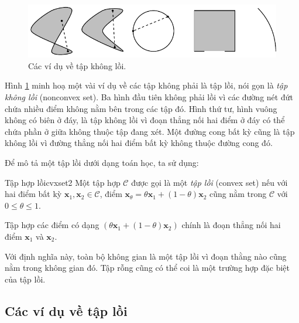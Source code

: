 
\begin{figure}[t]
\centering
\includegraphics[width = .8\textwidth]{Chapters/08_ConvexOptimization/16_convexity/latex/nonconvexsets.pdf}
\caption[]{Các ví dụ về tập không lồi.}
\label{fig:16_nonconvexsets}
\end{figure}

Hình \ref{fig:16_nonconvexsets} minh hoạ một vài ví dụ về các tập không phải là
tập lồi, nói gọn là \textit{tập không lồi} ({nonconvex set}). Ba hình đầu
tiên không phải lồi vì các đường nét đứt chứa nhiều điểm không nằm bên trong các
tập đó. Hình thứ tư, hình vuông không có biên ở đáy, là tập không lồi vì đoạn thẳng nối hai điểm ở đáy có thể chứa phần ở giữa không
thuộc tập đang xét. Một đường cong
bất kỳ cũng là tập không lồi vì đường thẳng nối hai điểm
bất kỳ không thuộc đường cong đó.

Để mô tả một {tập lồi} dưới dạng toán học, ta sử dụng:

\begin{mydef}{Tập hợp lồi}{cvxset2}
Một tập hợp $\mathcal{C}$ được gọi là một {\textit{tập lồi}} (convex set) nếu với hai điểm bất
kỳ $\mathbf{x}_1, \mathbf{x}_2 \in \mathcal{C}$, điểm $ \mathbf{x}_{\theta} =
\theta \mathbf{x}_1 + (1 - \theta) \mathbf{x}_2$ cũng nằm trong $\mathcal{C}$
với $0 \leq \theta \leq 1$.
\end{mydef}

Tập hợp các điểm có dạng $\left(\theta \mathbf{x}_1 + (1 -
\theta) \mathbf{x}_2\right)$ chính là {đoạn thẳng} nối hai điểm
$\mathbf{x}_1$ và $\mathbf{x}_2$.

Với định nghĩa này, {toàn bộ không gian} là một {tập lồi}
vì đoạn thằng nào cũng nằm trong không gian đó. Tập rỗng cũng có thể coi là một
trường hợp đặc biệt của {tập lồi}.

\subsection{Các ví dụ về tập lồi}

